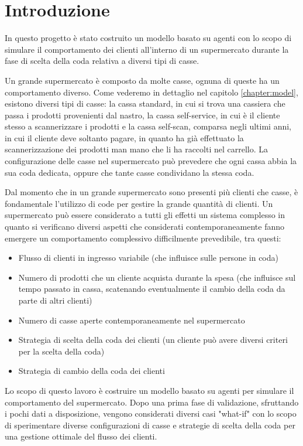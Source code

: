 \chapter{Introduzione}

In questo progetto è stato costruito un modello basato su agenti con lo scopo di simulare il comportamento dei clienti all'interno di un supermercato durante la fase di scelta della coda relativa a diversi tipi di casse.

Un grande supermercato è composto da molte casse, ognuna di queste ha un comportamento diverso. Come vederemo in dettaglio nel capitolo \ref{chapter:model}, esistono diversi tipi di casse: la cassa standard, in cui si trova una cassiera che passa i prodotti provenienti dal nastro, la cassa self-service, in cui è il cliente stesso a scannerizzare i prodotti e la cassa self-scan, comparsa negli ultimi anni, in cui il cliente deve soltanto pagare, in quanto ha già effettuato la scannerizzazione dei prodotti man mano che li ha raccolti nel carrello. La configurazione delle casse nel supermercato può prevedere che ogni cassa abbia la sua coda dedicata, oppure che tante casse condividano la stessa coda.

Dal momento che in un grande supermercato sono presenti più clienti che casse, è fondamentale l'utilizzo di code per gestire la grande quantità di clienti.  Un supermercato può essere considerato a tutti gli effetti un sistema complesso in quanto si verificano diversi aspetti che considerati contemporaneamente fanno emergere un comportamento complessivo difficilmente prevedibile, tra questi:
\begin{itemize}
	\item Flusso di clienti in ingresso variabile (che influisce sulle persone in coda)
	\item Numero di prodotti che un cliente acquista durante la spesa (che influisce sul tempo passato in cassa, scatenando eventualmente il cambio della coda da parte di altri clienti)
	\item Numero di casse aperte contemporaneamente nel supermercato
	\item Strategia di scelta della coda dei clienti (un cliente può avere diversi criteri per la scelta della coda)
	\item Strategia di cambio della coda dei clienti
\end{itemize}


Lo scopo di questo lavoro è costruire un modello basato su agenti per simulare il comportamento del supermercato. Dopo una prima fase di validazione, sfruttando i pochi dati a disposizione, vengono considerati diversi casi "what-if" con lo scopo di sperimentare diverse configurazioni di casse e strategie di scelta della coda per una gestione ottimale del flusso dei clienti. 
